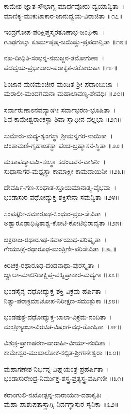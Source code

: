 ಕಾಮೇಶ-ಜ್ಞಾತ-ಸೌಭಾಗ್ಯ-ಮಾರ್ದವೋರು-ದ್ವಯಾನ್ವಿತಾ~।\\
ಮಾಣಿಕ್ಯ-ಮುಕುಟಾಕಾರ-ಜಾನುದ್ವಯ-ವಿರಾಜಿತಾ ॥೧೭॥

ಇಂದ್ರಗೋಪ-ಪರಿಕ್ಷಿಪ್ತಸ್ಮರತೂಣಾಭ-ಜಂಘಿಕಾ~।\\
ಗೂಢಗುಲ್ಫಾ ಕೂರ್ಮಪೃಷ್ಠ-ಜಯಿಷ್ಣು-ಪ್ರಪದಾನ್ವಿತಾ ॥೧೮॥

ನಖ-ದೀಧಿತಿ-ಸಂಛನ್ನ-ನಮಜ್ಜನ-ತಮೋಗುಣಾ~।\\
ಪದದ್ವಯ-ಪ್ರಭಾಜಾಲ-ಪರಾಕೃತ-ಸರೋರುಹಾ ॥೧೯॥

ಶಿಂಜಾನ-ಮಣಿಮಂಜೀರ-ಮಂಡಿತ-ಶ್ರೀ-ಪದಾಂಬುಜಾ~।\\
ಮರಾಲೀ-ಮಂದಗಮನಾ ಮಹಾಲಾವಣ್ಯ-ಶೇವಧಿಃ ॥೨೦॥

ಸರ್ವಾರುಣಾಽನವದ್ಯಾಂಗೀ ಸರ್ವಾಭರಣ-ಭೂಷಿತಾ~।\\
ಶಿವ-ಕಾಮೇಶ್ವರಾಂಕಸ್ಥಾ ಶಿವಾ ಸ್ವಾಧೀನ-ವಲ್ಲಭಾ ॥೨೧॥

ಸುಮೇರು-ಮಧ್ಯ-ಶೃಂಗಸ್ಥಾ ಶ್ರೀಮನ್ನಗರ-ನಾಯಿಕಾ~।\\
ಚಿಂತಾಮಣಿ-ಗೃಹಾಂತಸ್ಥಾ ಪಂಚ-ಬ್ರಹ್ಮಾಸನ-ಸ್ಥಿತಾ ॥೨೨॥

ಮಹಾಪದ್ಮಾಟವೀ-ಸಂಸ್ಥಾ ಕದಂಬವನ-ವಾಸಿನೀ~।\\
ಸುಧಾಸಾಗರ-ಮಧ್ಯಸ್ಥಾ ಕಾಮಾಕ್ಷೀ ಕಾಮದಾಯಿನೀ ॥೨೩॥

ದೇವರ್ಷಿ-ಗಣ-ಸಂಘಾತ-ಸ್ತೂಯಮಾನಾತ್ಮ-ವೈಭವಾ~।\\
ಭಂಡಾಸುರ-ವಧೋದ್ಯುಕ್ತ-ಶಕ್ತಿಸೇನಾ-ಸಮನ್ವಿತಾ ॥೨೪॥

ಸಂಪತ್ಕರೀ-ಸಮಾರೂಢ-ಸಿಂಧುರ-ವ್ರಜ-ಸೇವಿತಾ~।\\
ಅಶ್ವಾರೂಢಾಧಿಷ್ಠಿತಾಶ್ವ-ಕೋಟಿ-ಕೋಟಿಭಿರಾವೃತಾ ॥೨೫॥

ಚಕ್ರರಾಜ-ರಥಾರೂಢ-ಸರ್ವಾಯುಧ-ಪರಿಷ್ಕೃತಾ~।\\
ಗೇಯಚಕ್ರ-ರಥಾರೂಢ-ಮಂತ್ರಿಣೀ-ಪರಿಸೇವಿತಾ ॥೨೬॥

ಕಿರಿಚಕ್ರ-ರಥಾರೂಢ-ದಂಡನಾಥಾ-ಪುರಸ್ಕೃತಾ~।\\
ಜ್ವಾಲಾ-ಮಾಲಿನಿಕಾಕ್ಷಿಪ್ತ-ವಹ್ನಿಪ್ರಾಕಾರ-ಮಧ್ಯಗಾ ॥೨೭॥

ಭಂಡಸೈನ್ಯ-ವಧೋದ್ಯುಕ್ತ-ಶಕ್ತಿ-ವಿಕ್ರಮ-ಹರ್ಷಿತಾ~।\\
ನಿತ್ಯಾ-ಪರಾಕ್ರಮಾಟೋಪ-ನಿರೀಕ್ಷಣ-ಸಮುತ್ಸುಕಾ ॥೨೮॥

ಭಂಡಪುತ್ರ-ವಧೋದ್ಯುಕ್ತ-ಬಾಲಾ-ವಿಕ್ರಮ-ನಂದಿತಾ~।\\
ಮಂತ್ರಿಣ್ಯಂಬಾ-ವಿರಚಿತ-ವಿಷಂಗ-ವಧ-ತೋಷಿತಾ ॥೨೯॥

ವಿಶುಕ್ರ-ಪ್ರಾಣಹರಣ-ವಾರಾಹೀ-ವೀರ್ಯ-ನಂದಿತಾ~।\\
ಕಾಮೇಶ್ವರ-ಮುಖಾಲೋಕ-ಕಲ್ಪಿತ-ಶ್ರೀಗಣೇಶ್ವರಾ ॥೩೦॥

ಮಹಾಗಣೇಶ-ನಿರ್ಭಿನ್ನ-ವಿಘ್ನಯಂತ್ರ-ಪ್ರಹರ್ಷಿತಾ~।\\
ಭಂಡಾಸುರೇಂದ್ರ-ನಿರ್ಮುಕ್ತ-ಶಸ್ತ್ರ-ಪ್ರತ್ಯಸ್ತ್ರ-ವರ್ಷಿಣೀ ॥೩೧॥

ಕರಾಂಗುಲಿ-ನಖೋತ್ಪನ್ನ-ನಾರಾಯಣ-ದಶಾಕೃತಿಃ~।\\
ಮಹಾ-ಪಾಶುಪತಾಸ್ತ್ರಾಗ್ನಿ-ನಿರ್ದಗ್ಧಾಸುರ-ಸೈನಿಕಾ ॥೩೨॥

